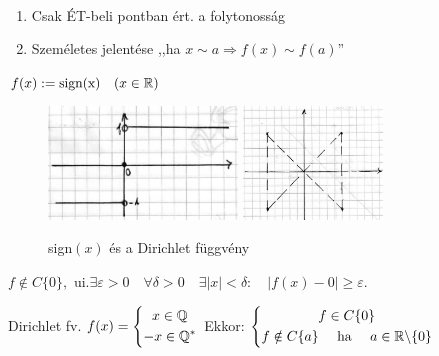 \documentclass[a4paper,11.5pt]{article}
\begin{document}
		\begin{note} \
			
			\begin{enumerate}
				\item Csak ÉT-beli pontban ért. a folytonosság
				\item Személetes jelentése ,,ha $x\sim a \Rightarrow f(x) \sim f(a)$''
			\end{enumerate}
		\end{note}
		
		\begin{example} 
			$f(x) :=\text{sign(x)}\quad (x\in\mathbb{R})$
			
			\begin{figure}[H]
				\centering
				\includegraphics[height=3cm]{kepek/2_abra_signum.jpg}\quad \quad \quad 
				\includegraphics[height=3cm]{kepek/2_abra_dirichlet.jpg}
				\caption{sign$(x)$ és a Dirichlet függvény}\label{fig_dirichlet}
			\end{figure}
			
			$f\notin C\{0\},$ \quad ui.\quad $ \exists\varepsilon > 0 \quad \forall \delta > 0 \quad \exists |x|<\delta: \quad |f(x)-0|\geq\varepsilon$.
			
		\end{example} 
		
		\begin{example}
			Dirichlet fv.
			$f(x)=
			\left\{\begin{gathered}
				x \in \mathbb{Q} \\
				-x \in \mathbb{Q}^*
			\end{gathered}\right.$\quad \quad 
			Ekkor: $\left\{\begin{gathered}
				f\in C\{0\}\\
				f \notin C\{a\} \text{ \quad ha \quad }  a\in\mathbb{R}\backslash\{0\}
			\end{gathered} \right.$
		\end{example}
		
\end{document}
